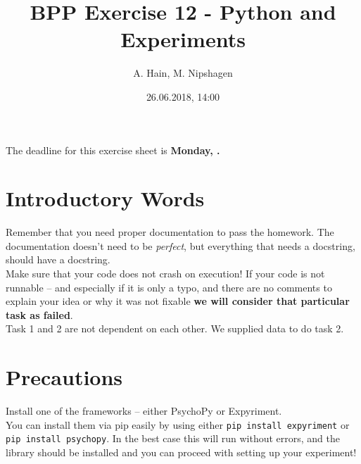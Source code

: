 
\usepackage{setspace}
\usepackage{enumerate}

\title{BPP Exercise 12 - Python and Experiments}
\author{A. Hain, M. Nipshagen}
\date{26.06.2018, 14:00}


\makeatletter
\let\thetitle\@title
\let\theauthor\@author
\let\thedate\@date
\makeatother


\newcommand\itemsub[1]{
	\begin{itemize}
		\item #1
	\end{itemize}
}

\renewcommand\sol[1]{}




The deadline for this exercise sheet is \textbf{Monday, \thedate.}

\section*{Introductory Words}
Remember that you need proper documentation to pass
the homework. The documentation doesn't need to be \textit{perfect}, but
everything that needs a docstring, should have a docstring.\\
Make sure that your code does not crash on execution! If your code is not
runnable -- and especially if it is only a typo, and there are no comments
to explain your idea or why it was not fixable \textbf{we will consider that
particular task as failed}.\\
Task 1 and 2 are not dependent on each other. We supplied data to do task 2.

\section*{Precautions}
Install one of the frameworks -- either PsychoPy or Expyriment.\\
You can install them via pip easily by using either
\verb|pip install expyriment| or
\verb|pip install psychopy|. In the best case this will run without errors, and
the library should be installed and you can proceed with setting up your experiment!


